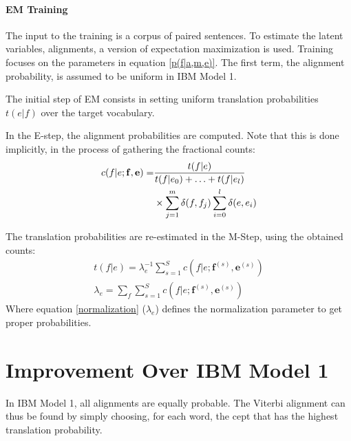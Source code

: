 \documentclass[11pt]{article}
\renewcommand{\vec}[1]{\mathbf{#1}}
\begin{document}


\paragraph{EM Training}
The input to the training is a corpus of paired sentences.
To estimate the latent variables, alignments, a version of expectation maximization is used.
Training focuses on the parameters in equation \ref{p(f|a,m,e)}. The first term, the alignment probability, is assumed to be uniform in IBM Model 1.

The initial step of EM consists in setting uniform translation probabilities $t(e|f)$ over the target vocabulary. 

In the E-step, the alignment probabilities are computed. Note that this is done implicitly, in the process of gathering the fractional counts:
\begin{align}
c(f|e;\vec{f},\vec{e}) =& 
\frac{t(f|e)}{t(f|e_0)+\ldots+t(f|e_l)} \notag\\
&\times \sum_{j=1}^m \delta(f,f_j) \sum_{i=0}^l \delta(e,e_i)
\end{align}

The translation probabilities are re-estimated in the M-Step, using the obtained counts:
\begin{align}
t(f|e) = \lambda_e^{-1} \sum_{s=1}^S c(f|e;\vec{f}^{(s)},\vec{e}^{(s)})\\ 
\lambda_e = \sum_f\sum_{s=1}^S c(f|e;\vec{f}^{(s)},\vec{e}^{(s)}) \label{normalization}
\end{align}
Where equation \ref{normalization} ($\lambda_e$) defines the normalization parameter to get proper probabilities.


\section{Improvement Over IBM Model 1}
\label{Improvement}

In IBM Model 1, all alignments are equally probable. The Viterbi alignment can thus be found by simply choosing, for each word, the cept that has the highest translation probability. 
\end{document}
